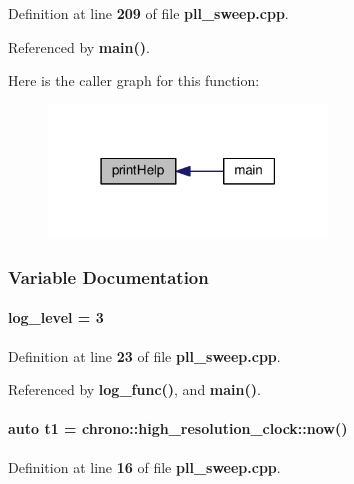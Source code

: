 Definition at line {\bf 209} of file {\bf pll\+\_\+sweep.\+cpp}.



Referenced by {\bf main()}.



Here is the caller graph for this function\+:
\nopagebreak
\begin{figure}[H]
\begin{center}
\leavevmode
\includegraphics[width=210pt]{d4/d8f/pll__sweep_8cpp_a777770ba97bdada876f99f22e62b432c_icgraph}
\end{center}
\end{figure}




\subsubsection{Variable Documentation}
\paragraph[{log\+\_\+level}]{ log\+\_\+level = 3}\label{pll__sweep_8cpp_ab5a71c2541c377b3d5b34fdb35964c2e}


Definition at line {\bf 23} of file {\bf pll\+\_\+sweep.\+cpp}.



Referenced by {\bf log\+\_\+func()}, and {\bf main()}.

\paragraph[{t1}]{\setlength{\rightskip}{0pt plus 5cm}auto t1 = chrono\+::high\+\_\+resolution\+\_\+clock\+::now()}\label{pll__sweep_8cpp_ae2ca95b0071a009a78ce4339b81fdd36}


Definition at line {\bf 16} of file {\bf pll\+\_\+sweep.\+cpp}.



